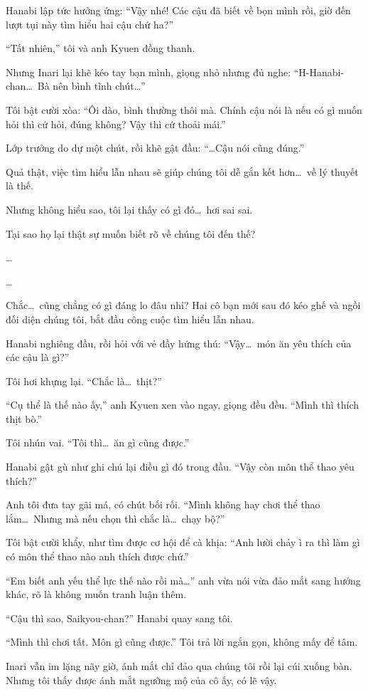 \documentclass[../main.tex]{subfiles}
\begin{document}
Hanabi lập tức hưởng ứng: ``Vậy nhé! Các cậu đã biết về bọn mình rồi, giờ đến lượt tụi này tìm hiểu hai cậu chứ ha?''

``Tất nhiên,'' tôi và anh Kyuen đồng thanh.

Nhưng Inari lại khẽ kéo tay bạn mình, giọng nhỏ nhưng đủ nghe: ``H-Hanabi-chan\dots\ Bà nên bình tĩnh chút\dots''

Tôi bật cười xòa: ``Ôi dào, bình thường thôi mà. Chính cậu nói là nếu có gì muốn hỏi thì cứ hỏi, đúng không? Vậy thì cứ thoải mái.''

Lớp trưởng do dự một chút, rồi khẽ gật đầu: ``\dots Cậu nói cũng đúng.''

Quả thật, việc tìm hiểu lẫn nhau sẽ giúp chúng tôi dễ gắn kết hơn\dots\ về lý thuyết là thế.

Nhưng không hiểu sao, tôi lại thấy có gì đó\dots\ hơi sai sai.

Tại sao họ lại thật sự muốn biết rõ về chúng tôi đến thế?

\dots

\dots

Chắc\dots\ cũng chẳng có gì đáng lo đâu nhỉ? Hai cô bạn mới sau đó kéo ghế và ngồi đối diện chúng tôi, bắt đầu công cuộc tìm hiểu lẫn nhau.

Hanabi nghiêng đầu, rồi hỏi với vẻ đầy hứng thú: ``Vậy\dots\ món ăn yêu thích của các cậu là gì?''

Tôi hơi khựng lại. ``Chắc là\dots\ thịt?''

``Cụ thể là thế nào ấy,'' anh Kyuen xen vào ngay, giọng đều đều. ``Mình thì thích thịt bò.''

Tôi nhún vai. ``Tôi thì\dots\ ăn gì cũng được.''

Hanabi gật gù như ghi chú lại điều gì đó trong đầu. ``Vậy còn môn thể thao yêu thích?''

Anh tôi đưa tay gãi má, có chút bối rối. ``Mình không hay chơi thể thao lắm\dots\ Nhưng mà nếu chọn thì chắc là\dots\ chạy bộ?''

Tôi bật cười khẩy, như tìm được cơ hội để cà khịa: ``Anh lười chảy ì ra thì làm gì có môn thể thao nào anh thích được chứ.''

``Em biết anh yếu thể lực thế nào rồi mà\dots'' anh vừa nói vừa đảo mắt sang hướng khác, rõ là không muốn tranh luận thêm.

``Cậu thì sao, Saikyou-chan?'' Hanabi quay sang tôi.

``Mình thì chơi tất. Môn gì cũng được.'' Tôi trả lời ngắn gọn, không mấy để tâm.

Inari vẫn im lặng nãy giờ, ánh mắt chỉ đảo qua chúng tôi rồi lại cúi xuống bàn. Nhưng tôi thấy được ánh mắt ngưỡng mộ của cô ấy, có lẽ vậy.
\end{document}
